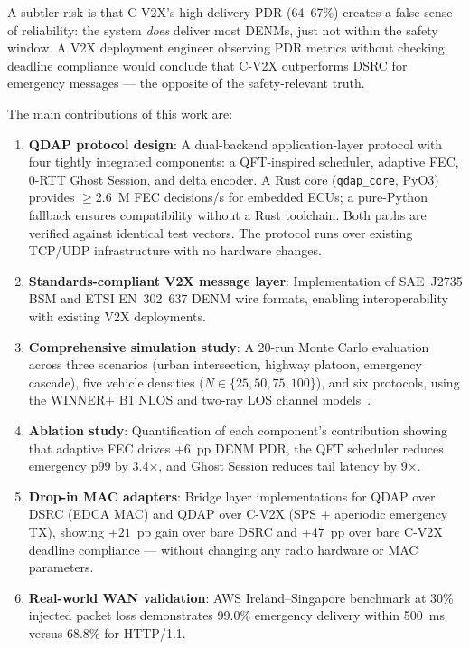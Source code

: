 \documentclass[journal]{IEEEtran}
\begin{document}
A subtler risk is that C-V2X's high delivery PDR (64--67\%) creates
a false sense of reliability: the system \emph{does} deliver most DENMs,
just not within the safety window.
A V2X deployment engineer observing PDR metrics without checking deadline
compliance would conclude that C-V2X outperforms DSRC for emergency
messages — the opposite of the safety-relevant truth.

The main contributions of this work are:

\begin{enumerate}
  \item \textbf{QDAP protocol design}: A dual-backend application-layer
        protocol with four tightly integrated components: a QFT-inspired
        scheduler, adaptive FEC, 0-RTT Ghost Session, and delta encoder.
        A Rust core (\texttt{qdap\_core}, PyO3) provides $\geq$2.6~M FEC
        decisions/s for embedded ECUs; a pure-Python fallback ensures
        compatibility without a Rust toolchain.
        Both paths are verified against identical test vectors.
        The protocol runs over existing TCP/UDP infrastructure
        with no hardware changes.

  \item \textbf{Standards-compliant V2X message layer}: Implementation of
        SAE~J2735 BSM and ETSI EN~302~637 DENM wire formats, enabling
        interoperability with existing V2X deployments.

  \item \textbf{Comprehensive simulation study}: A 20-run Monte Carlo
        evaluation across three scenarios (urban intersection, highway platoon,
        emergency cascade), five vehicle densities ($N \in \{25,50,75,100\}$),
        and six protocols, using the WINNER+ B1 NLOS and two-ray LOS channel
        models~\cite{WINNER_Plus_D53,Gozalvez2012}.

  \item \textbf{Ablation study}: Quantification of each component's
        contribution showing that adaptive FEC drives +6~pp DENM PDR, the
        QFT scheduler reduces emergency p99 by 3.4$\times$, and Ghost Session
        reduces tail latency by 9$\times$.

  \item \textbf{Drop-in MAC adapters}: Bridge layer implementations for
        QDAP over DSRC (EDCA MAC) and QDAP over C-V2X (SPS + aperiodic
        emergency TX), showing $+21$~pp gain over bare DSRC and $+47$~pp
        over bare C-V2X deadline compliance — without changing any radio
        hardware or MAC parameters.

  \item \textbf{Real-world WAN validation}: AWS Ireland–Singapore benchmark
        at 30\% injected packet loss demonstrates 99.0\% emergency delivery
        within \SI{500}{\milli\second} versus 68.8\% for HTTP/1.1.
\end{enumerate}
\end{document}
